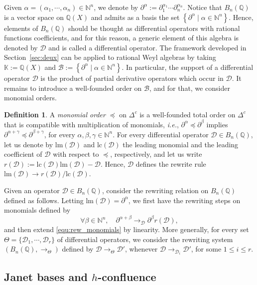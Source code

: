 \documentclass[10pt]{easychair}
\theoremstyle{definition}
\newtheorem{definition}[theorem]{Definition}
\newcommand\secTroisDeux{Janet bases and $h$-confluence}
\newcommand\ie{\emph{i.e.}}
\newcommand\diff[1]{\partial_{#1}}
\newcommand\D{\mathcal{D}}
\newcommand\lm{\text{lm}}
\newcommand\lc{\text{lc}}
\newcommand\basis{\mathscr{B}}
\newcommand\K{\mathbb{K}}
\newcommand\Q{\mathbb{Q}}
\newcommand\N{\mathbb{N}}
\newcommand\Weyl{B_n(\Q)}
\newcommand\rewTheta{\to_{\Theta}}
\begin{document}
Given $\alpha=(\alpha_1,\cdots,\alpha_n)\in\N^n$, we denote by 
$\partial^{\alpha}:=\diff{1}^{\alpha_1}\cdots\diff{n}^{\alpha_n}$. Notice
that $\Weyl$ is a vector space on $\Q(X)$ and admits as a basis the set
$\left\{\partial^\alpha\mid\alpha\in\N^n\right\}$. Hence, elements of
$\Weyl$ should be thought as differential operators with rational
functions coefficients, and for this reason, a generic element of this
algebra is denoted by $\D$ and is called a differential operator. The
framework developed in Section~\ref{sec:deux} can be applied to rational
Weyl algebras by taking $\K:=\Q(X)$ and
$\basis:=\left\{\partial^\alpha\mid\alpha\in\N^n\right\}$. In particular,
the support of a differential operator $\D$ is the product of partial
derivative operators which occur in $\D$. It remains to introduce a
well-founded order on $\basis$, and for that, we consider monomial
orders.

\begin{definition}
A {\em monomial order} $\preceq$ on $\Delta^c$ is a well-founded total
order on $\Delta^c$ that is compatible with multiplication of monomials,
\ie, $\partial^{\alpha}\preceq\partial^{\beta}$ implies
$\partial^{\alpha+\gamma}\preceq\partial^{\beta+\gamma}$, for every
$\alpha,\beta,\gamma\in\N^n$. For every differential operator
$\D\in\Weyl$, let us denote by $\lm(\D)$ and $\lc(\D)$ the leading
monomial and the leading coefficient of $\D$ with respect to $\preceq$,
respectively, and let us write $r(\D):=\lc(\D)\lm(\D)-\D$. Hence, $\D$
defines the rewrite rule $\lm(\D)\to r(\D)/\lc(\D)$.
\end{definition}

Given an operator $\D\in\Weyl$, consider the rewriting relation on
$\Weyl$ defined as follows. Letting $\lm(\D)=\partial^{\alpha}$, we first
have the rewriting steps on monomials defined by
\begin{equation}\label{equ:rew_monomials}
  \forall\beta\in\N^n,\quad\partial^{\alpha+\beta}
  \to_{\D}\partial^{\beta}r(\D),\end{equation}
and then extend \eqref{equ:rew_monomials} by linearity. More generally,
for every set $\Theta=\{\D_1,\cdots,\D_r\}$ of differential operators, we
consider the rewriting system $(\Weyl,\rewTheta)$ defined by
$\D\rewTheta\D'$, whenever $\D\to_{\D_i}\D'$, for some $1\leq i\leq r$.

\subsection{\secTroisDeux}\label{sec:troisDeux}
\end{document}
